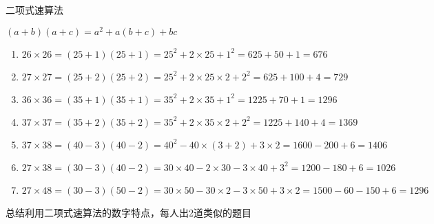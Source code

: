 \documentclass[aspectratio=169]{ctexbeamer} %
\date{\today}
\begin{document}
\begin{frame}[t]{二项式速算法}
\begin{spacing}{1.2}
\normalsize
$(a+b)(a+c)=a^2 + a(b+c) +bc$
\begin{enumerate}[label={\arabic*.}]
\item $26 \times 26  = (25+1)(25+1) = 25^2 + 2 \times 25 + 1^2 = 625 + 50 + 1 = 676$
\item $27 \times 27  = (25+2)(25+2) = 25^2 + 2 \times 25 \times 2 + 2^2 = 625 + 100 + 4 = 729$
\item $36 \times 36  = (35+1)(35+1) = 35^2 + 2 \times 35 + 1^2 = 1225 + 70 + 1 = 1296$
\item $37 \times 37  = (35+2)(35+2) = 35^2 + 2 \times 35 \times 2 + 2^2 = 1225 + 140 + 4 = 1369$
\item $37 \times 38  = (40-3)(40-2) = 40^2 - 40 \times (3 + 2) + 3 \times 2 = 1600 - 200 + 6 = 1406$
\item $27 \times 38  = (30-3)(40-2) = 30 \times 40 - 2 \times 30 - 3 \times 40 + 3^2 = 1200 - 180 + 6 = 1026$
\item $27 \times 48  = (30-3)(50-2) = 30 \times 50 - 30 \times 2 - 3 \times 50 + 3 \times 2 = 1500 - 60 - 150 + 6 = 1296$

\end{enumerate}
\alert{总结利用二项式速算法的数字特点，每人出2道类似的题目} \\
\end{spacing}
\end{frame}
\end{document}
